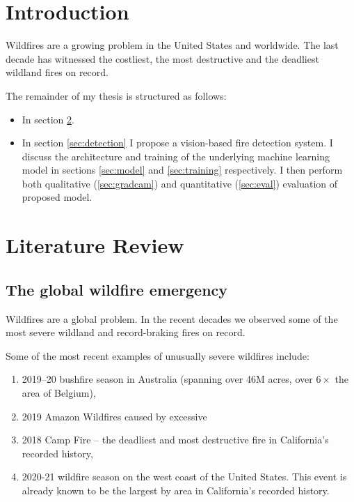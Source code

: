 \section{Introduction}\label{sec:introduction}


Wildfires are a growing problem in the United States and worldwide. The last decade has witnessed the costliest, the
most destructive and the deadliest wildland fires on record.



The remainder of my thesis is structured as follows:

\begin{itemize}
  \item In section \ref{sec:literature_review}.
  \item In section \ref{sec:detection} I propose a vision-based fire detection system. 
        I discuss the architecture and training of the underlying machine learning model in sections \ref{sec:model} and \ref{sec:training} respectively.
        I then perform both qualitative (\ref{sec:gradcam}) and quantitative (\ref{sec:eval}) evaluation of proposed model.


\end{itemize}


\section{Literature Review}\label{sec:literature_review}

  \subsection{The global wildfire emergency}

  Wildfires are a global problem. In the recent decades we observed some of the most severe wildland and record-braking fires on record. 
  
  Some of the most recent examples of unusually severe wildfires include:
  \begin{enumerate}
    \item 2019–20 bushfire season in Australia (spanning over 46M acres, over $6 \times$ the area of Belgium),
    \item 2019 Amazon Wildfires caused by excessive
    \item 2018 Camp Fire -- the deadliest and most destructive fire in California’s recorded history,
    \item 2020-21 wildfire season on the west coast of the United States.
          This event is already known to be the largest by area in California's recorded history.
  \end{enumerate}

